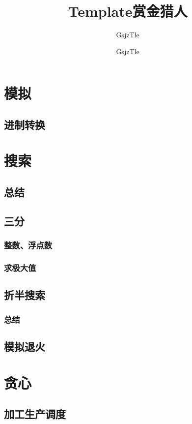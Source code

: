 \documentclass[10pt,a4paper]{article}
\title{Template}
\author{GsjzTle}
\begin{document}
	\title{赏金猎人}
	\author {GsjzTle}
	\maketitle
	\tableofcontents
	\newpage
	\section{模拟}
	\subsection{进制转换}
	
	\section{搜索}
	\subsection{总结}
	
	\subsection{三分}
	\subsubsection{整数、浮点数}
	
	\subsubsection{求极大值}
	
	\subsection{折半搜索}
	\subsubsection{总结}
	
	\subsection{模拟退火}
	
	\section{贪心}
	\subsection{加工生产调度}
	
\end{document}
